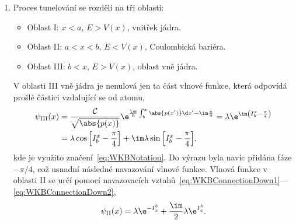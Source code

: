\begin{solution}
	\begin{enumerate}
	\item
		Proces tunelování se rozdělí na tři oblasti:
		\begin{itemize}
		\item
			Oblast I: $x<a$, $E>V(x)$, vnitřek jádra.
		\item
			Oblast II: $a<x<b$, $E<V(x)$, Coulombická bariéra.
		\item
			Oblast III: $b<x$, $E>V(x)$, oblast vně jádra.
		\end{itemize}
		
		V oblasti III vně jádra je nenulová jen ta část vlnové funkce, která odpovídá prošlé částici vzdalující se od atomu,
		\begin{align}
			\psi_{\mathrm{III}}(x)
				&=\frac{\mathcal{C}}{\sqrt{\abs{p(x)}}}\e^{\frac{\im}{\hbar}\int_{b}^{x}\abs{p(x')}\d x'-\im\frac{\pi}{4}}
				 =\lambda\e^{\im\left(I_{b}^{x}-\frac{\pi}{4}\right)}\nonumber\\
				&=\lambda\cos{\left[I_{b}^{x}-\frac{\pi}{4}\right]}+\im\lambda\sin{\left[I_{b}^{x}-\frac{\pi}{4}\right]},
		\end{align}
		kde je využito značení~\eqref{eq:WKBNotation}. 
		Do výrazu byla navíc přidána fáze $-\pi/4$, což usnadní následné navazování vlnové funkce.
		Vlnová funkce v oblasti II se určí pomocí navazovacích vztahů~\eqref{eq:WKBConnectionDown1}---\eqref{eq:WKBConnectionDown2},
		\begin{equation}
			\psi_{\mathrm{II}}(x)=\lambda\e^{-I_{x}^{b}}+\frac{\im}{2}\lambda\e^{I_{x}^{b}}.
		\end{equation}
		

\end{enumerate}
\end{solution}
